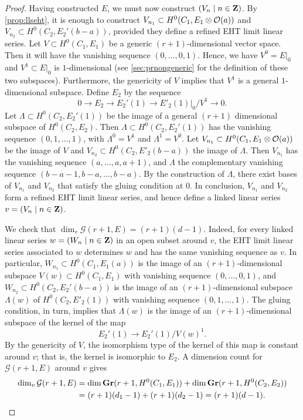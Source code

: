 \begin{proof}
  Having constructed $E$, we must now construct $(V_n \mid n \in {\bf Z})$.
  By \autoref{prop:llseht}, it is enough to construct $V_{n_1} \subset H^0(C_1, E_1 \otimes \mathcal O(a))$ and $V_{n_2} \subset H^0(C_2, E_2'(b-a))$, provided they define a refined EHT limit linear series.
  Let $V \subset H^0(C_1, E_1)$ be a generic $(r+1)$-dimensional vector space.
  Then it will have the vanishing sequence $(0, \dots, 0, 1)$.
  Hence, we have $V^0 = E|_0$ and $V^1 \subset E|_0$ is $1$-dimensional (see \autoref{sec:prnongeneric} for the definition of these two subspaces).
  Furthermore, the genericity of $V$ implies that $V^1$ is a general $1$-dimensional subspace.
  Define $E_2$ by the sequence
  \[ 0 \to E_2 \to E_2'(1) \to E'_2(1)|_0 / V^1 \to 0.\]
  Let $\Lambda \subset H^0(C_2, E_2'(1))$ be the image of a general $(r+1)$ dimensional subspace of $H^0(C_2, E_2)$.
  Then $\Lambda \subset H^0(C_2, E_2'(1))$ has the vanishing sequence $(0, 1, \dots, 1)$, with $\Lambda^0 = V^1$ and $\Lambda^1 = V^0$.
  Let $V_{n_1} \subset H^0(C_1, E_1 \otimes \mathcal O(a))$ be the image of $V$ and $V_{n_2} \subset H^0(C_2,E'_2(b-a))$ the image of $\Lambda$.
  Then $V_{n_1}$ has the vanishing sequence $(a, \dots, a, a+1)$, and $\Lambda$ the complementary vanishing sequence $(b-a-1, b-a, \dots, b-a)$.
  By the construction of $\Lambda$, there exist bases of $V_{n_1}$ and $V_{n_2}$ that satisfy the gluing condition at $0$.
  In conclusion, $V_{n_1}$ and $V_{n_2}$ form a refined EHT limit linear series, and hence define a linked linear series $v = (V_n \mid n \in {\bf Z})$.

  We check that $\dim_v \mathcal G(r+1, E) = (r+1)(d-1)$.
  Indeed, for every linked linear series $w = (W_n \mid n \in {\bf Z})$ in an open subset around $v$, the EHT limit linear series associated to $w$ determines $w$ and has the same vanishing sequence as $v$.
  In particular, $W_{n_1} \subset H^0(C_1, E_1(a))$ is the image of an $(r+1)$-dimensional subspace $V(w) \subset H^0(C_1, E_1)$ with vanishing sequence $(0, \dots, 0, 1)$, and $W_{n_2} \subset H^0(C_2, E_2'(b-a))$ is the image of an $(r+1)$-dimensional subspace $\Lambda(w)$ of $H^0(C_2, E'_2(1))$ with vanishing sequence $(0,1,\dots,1)$.
  The gluing condition, in turn, implies that $\Lambda(w)$ is the image of an $(r+1)$-dimensional subspace of the kernel of the map
  \[ E_2'(1) \to E_2'(1)/V(w)^1.\]
  By the genericity of $V$, the isomorphism type of the kernel of this map is constant around $v$; that is, the kernel is isomorphic to $E_2$.
  A dimension count for $\mathcal G(r+1, E)$ around $v$ gives
  \begin{align*}
    \dim_v \mathcal G(r+1, E) &= \dim {\bf Gr}(r+1, H^0(C_1, E_1)) + \dim {\bf Gr}(r+1, H^0(C_2, E_2))\\
                              &= (r+1)(d_1-1) + (r+1)(d_2-1) = (r+1)(d-1).\\
  \end{align*}


\end{proof}
